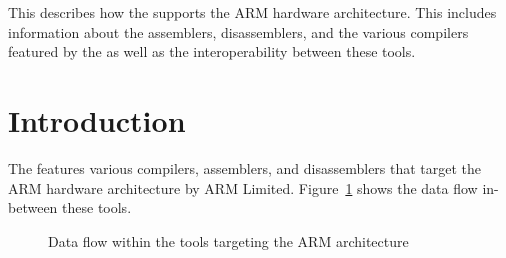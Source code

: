 




\renewcommand{\seearm}{}

{This \documentation{} describes how the \ecs{} supports the ARM hardware architecture.
This includes information about the assemblers, disassemblers, and the various compilers featured by the \ecs{} as well as the interoperability between these tools.}

\section{Introduction}

The \ecs{} features various compilers, assemblers, and disassemblers that target the ARM hardware architecture by ARM Limited.
Figure~\ref{fig:armdataflow} shows the data flow in-between these tools.

\begin{figure}
\caption{Data flow within the tools targeting the ARM architecture}
\label{fig:armdataflow}
\end{figure}

